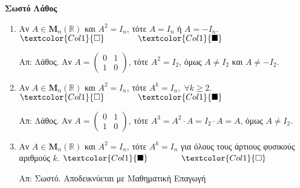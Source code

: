 



\pagestyle{askhseis}




\begin{center}
  \minibox{\large\bfseries \textcolor{Col2}{Πίνακες}}
\end{center}


\vspace{\baselineskip}

\hfill \textcolor{Col1}{\textbf{Σωστό}} \quad \textcolor{Col1}{\textbf{Λάθος}}
\begin{enumerate}[itemsep=.5\baselineskip]
  \item \textcolor{Col1}{Αν $ A \in \textbf{M}_{n}(\mathbb{R}) $ και $
      A^{2}=I_{n} $, τότε $ A=I_{n} $ ή $ A=-I_{n} $}. 
    \hfill $\textcolor{Col1}{\square} \qquad \qquad \textcolor{Col1}{\blacksquare}$

    Απ: Λάθος. Αν $ A= 
    \begin{pmatrix}
      0 & 1 \\
      1 & 0
    \end{pmatrix} $, τότε $ A^{2}=I_{2} $, όμως $ A \neq I_{2} $ και $ A \neq -I_{2} $.

  \item \textcolor{Col1}{Αν $ A \in \textbf{M}_{n}(\mathbb{R}) $ και $
      A^{2}=I_{n}
    $, τότε $ A^{k}=I_{n}, \; \forall k \geq 2 $}.
    \hfill $\textcolor{Col1}{\square} \qquad \qquad \textcolor{Col1}{\blacksquare}$

    Απ: Λάθος. Αν $ A= 
    \begin{pmatrix}
      0 & 1 \\
      1 & 0
    \end{pmatrix} $, τότε $ A^{3}= A^{2}\cdot A = I_{2} \cdot A = A $, 
    όμως $ A \neq I_{2} $.

  \item \textcolor{Col1}{Αν $ A \in \textbf{M}_{n}(\mathbb{R}) $ και $ A^{2}=I_{n} $, 
    τότε $ A^{k}=I_{n} $ για όλους τους άρτιους φυσικούς αριθμούς $k$}.
    \hfill $\textcolor{Col1}{\blacksquare} \qquad \qquad \textcolor{Col1}{\square}$

    Απ: Σωστό. Αποδεικνύεται με Μαθηματική Επαγωγή
       

\end{enumerate}






